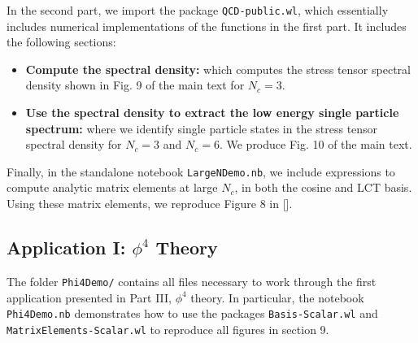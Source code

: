\documentclass[12pt]{article}
\begin{document}
In the second part, we import the package {\tt QCD-public.wl}, which essentially includes numerical implementations of the functions in the first part. It includes the following sections:
\begin{itemize}
  \item \textbf{Compute the spectral density:} which computes the stress tensor spectral density shown in Fig. 9 of the main text for $N_c = 3$.
  \item \textbf{Use the spectral density to extract the low energy single particle spectrum:} where we identify single particle states in the stress tensor spectral density for $N_c=3$ and $N_c = 6$. We produce Fig. 10 of the main text.
\end{itemize}

Finally, in the standalone notebook {\tt LargeNDemo.nb}, we include expressions to compute analytic matrix elements at large $N_c$, in both the cosine and LCT basis. Using these matrix elements, we reproduce Figure 8 in [].

\subsection{Application I: $\phi^4$ Theory}

The folder {\tt Phi4Demo/} contains all files necessary to work through the first application presented in Part III, $\phi^4$ theory. In particular, the notebook {\tt Phi4Demo.nb} demonstrates how to use the packages {\tt Basis-Scalar.wl} and {\tt MatrixElements-Scalar.wl} to reproduce all figures in section 9.
\end{document}
